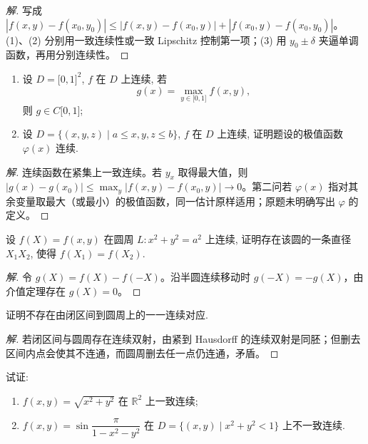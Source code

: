\documentclass[../../数学分析培优讲义(答案版).tex]{subfiles}
\begin{document}
\begin{proof}[解]
写成 $|f(x,y)-f(x_0,y_0)|\leq|f(x,y)-f(x_0,y)|+|f(x_0,y)-f(x_0,y_0)|$。(1)、(2) 分别用一致连续性或一致 Lipschitz 控制第一项；(3) 用 $y_0\pm\delta$ 夹逼单调函数，再用分别连续性。
\end{proof}

\begin{example}[\markstar]
\begin{enumerate}[label=(\arabic*)]
    \item 设 $D=\lbrack0,1\rbrack^2$, $f$ 在 $D$ 上连续, 若
    \[
        g(x)=\max_{y\in\lbrack0,1\rbrack}f(x,y),
    \]
    则 $g\in C\lbrack0,1\rbrack$;
    \item 设 $D=\{(x,y,z)\mid a\leq x,y,z\leq b\}$, $f$ 在 $D$ 上连续, 证明题设的极值函数 $\varphi(x)$ 连续.
\end{enumerate}
\end{example}

\begin{proof}[解]
连续函数在紧集上一致连续。若 $y_x$ 取得最大值，则
$|g(x)-g(x_0)|\leq\max_y|f(x,y)-f(x_0,y)|\to0$。第二问若 $\varphi(x)$ 指对其余变量取最大（或最小）的极值函数，同一估计原样适用；原题未明确写出 $\varphi$ 的定义。
\end{proof}

\begin{example}
设 $f(X)=f(x,y)$ 在圆周 $L:x^2+y^2=a^2$ 上连续, 证明存在该圆的一条直径 $X_1X_2$, 使得 $f(X_1)=f(X_2)$.
\end{example}

\begin{proof}[解]
令 $g(X)=f(X)-f(-X)$。沿半圆连续移动时 $g(-X)=-g(X)$，由介值定理存在 $g(X)=0$。
\end{proof}

\begin{example}
证明不存在由闭区间到圆周上的一一连续对应.
\end{example}

\begin{proof}[解]
若闭区间与圆周存在连续双射，由紧到 Hausdorff 的连续双射是同胚；但删去区间内点会使其不连通，而圆周删去任一点仍连通，矛盾。
\end{proof}

\begin{example}
试证:
\begin{enumerate}[label=(\arabic*)]
    \item $f(x,y)=\sqrt{x^2+y^2}$ 在 $\mathbb{R}^2$ 上一致连续;
    \item $\displaystyle f(x,y)=\sin\dfrac{\pi}{1-x^2-y^2}$ 在 $D=\{(x,y)\mid x^2+y^2<1\}$ 上不一致连续.
\end{enumerate}
\end{example}
\end{document}
